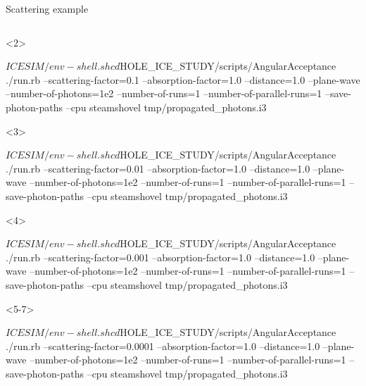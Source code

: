 \begin{frame}[fragile]{Scattering example}
\begin{columns}
\begin{column}{0.5\textwidth}
      \begin{onlyenv}<2>
        \begin{smallbash}
          $ICESIM/env-shell.sh
          cd $HOLE_ICE_STUDY/scripts/AngularAcceptance
          ./run.rb --scattering-factor=0.1 --absorption-factor=1.0 --distance=1.0 --plane-wave --number-of-photons=1e2 --number-of-runs=1 --number-of-parallel-runs=1 --save-photon-paths --cpu
          steamshovel tmp/propagated_photons.i3
        \end{smallbash}
      \end{onlyenv}

      \begin{onlyenv}<3>
        \begin{smallbash}
          $ICESIM/env-shell.sh
          cd $HOLE_ICE_STUDY/scripts/AngularAcceptance
          ./run.rb --scattering-factor=0.01 --absorption-factor=1.0 --distance=1.0 --plane-wave --number-of-photons=1e2 --number-of-runs=1 --number-of-parallel-runs=1 --save-photon-paths --cpu
          steamshovel tmp/propagated_photons.i3
        \end{smallbash}
      \end{onlyenv}

      \begin{onlyenv}<4>
        \begin{smallbash}
          $ICESIM/env-shell.sh
          cd $HOLE_ICE_STUDY/scripts/AngularAcceptance
          ./run.rb --scattering-factor=0.001 --absorption-factor=1.0 --distance=1.0 --plane-wave --number-of-photons=1e2 --number-of-runs=1 --number-of-parallel-runs=1 --save-photon-paths --cpu
          steamshovel tmp/propagated_photons.i3
        \end{smallbash}
      \end{onlyenv}

      \begin{onlyenv}<5-7>
        \begin{smallbash}
          $ICESIM/env-shell.sh
          cd $HOLE_ICE_STUDY/scripts/AngularAcceptance
          ./run.rb --scattering-factor=0.0001 --absorption-factor=1.0 --distance=1.0 --plane-wave --number-of-photons=1e2 --number-of-runs=1 --number-of-parallel-runs=1 --save-photon-paths --cpu
          steamshovel tmp/propagated_photons.i3
        \end{smallbash}
      \end{onlyenv}

    \end{column}
  \end{columns}


\end{frame}

